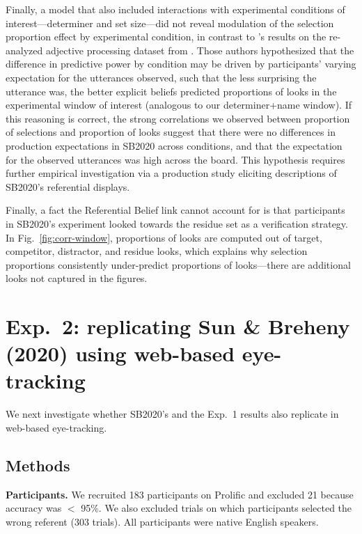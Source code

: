 \documentclass[10pt,letterpaper]{article}
\newcommand{\figref}[1]{Fig.~\ref{#1}}
\newcommand{\expref}[1]{Exp.~#1}
\begin{document}
Finally, a model that also included interactions with experimental conditions of interest---determiner and set size---did not reveal modulation of the selection proportion effect by experimental condition, in contrast to 's results on the re-analyzed adjective processing dataset from . Those authors hypothesized that the difference in predictive power by condition may be driven by participants' varying expectation for the utterances observed, such that the less surprising the utterance was, the better explicit beliefs predicted proportions of looks in the experimental window of interest (analogous to our determiner+name window). If this reasoning is correct, the  strong correlations we observed between proportion of selections and proportion of looks suggest that there were no differences in production expectations in SB2020 across conditions, and that the expectation for the observed utterances was high across the board.  This hypothesis requires further empirical investigation via a production study eliciting descriptions of SB2020's referential displays.

Finally, a  fact the Referential Belief link cannot account for is  that participants in SB2020's experiment  looked towards the  residue set as a verification strategy. In \figref{fig:corr-window}, %
proportions of looks  are computed out of target, competitor, distractor, and residue looks, which explains why selection proportions consistently under-predict proportions of looks---there are additional looks not captured in the figures. 

\section{Exp.~2: replicating Sun \& Breheny (2020) using web-based eye-tracking}

We next investigate whether SB2020's and the \expref{1} results  also replicate in web-based eye-tracking.

\subsection{Methods}

\textbf{Participants.} We recruited 183 participants on Prolific and excluded 21  because  accuracy was $<$ 95\%. We also excluded trials on which participants selected the wrong referent (303 trials). All participants were native English speakers.
\end{document}
